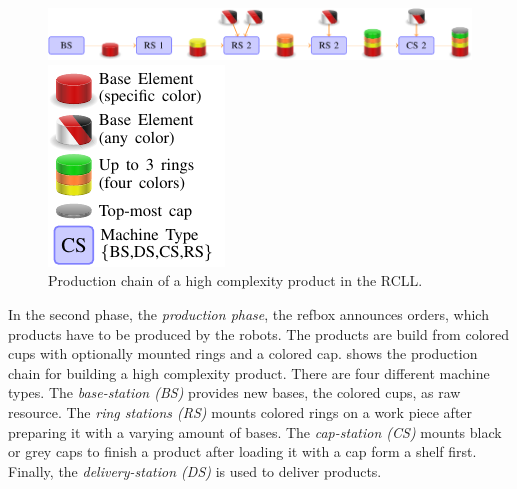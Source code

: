 \begin{figure}[t]
  \centering
  \begin{minipage}{.8\linewidth}
  \includegraphics[width=\linewidth]{img/chain_c3}%
  \end{minipage}
  \quad%
  \begin{minipage}{.15\linewidth}
  \includegraphics[width=\linewidth]{img/legend}%
  \end{minipage}
  \caption{Production chain of a high complexity
    product in the RCLL.}
  \vspace{-2mm}
  \label{fig:prod-chain}
\end{figure}

In the second phase, the \emph{production phase}, the refbox announces
orders, which products have to be produced by the robots. The products
are build from colored cups with optionally mounted rings and a
colored cap.   shows the production chain for
building a high complexity product.  There are four different machine
types. The \emph{base-station (BS)} provides new bases, the colored
cups, as raw resource. The \emph{ring stations (RS)} mounts colored
rings on a work piece after preparing it with a varying amount of
bases.  The \emph{cap-station (CS)} mounts black or grey caps to
finish a product after loading it with a cap form a shelf first.
Finally, the \emph{delivery-station (DS)} is used to deliver products.

